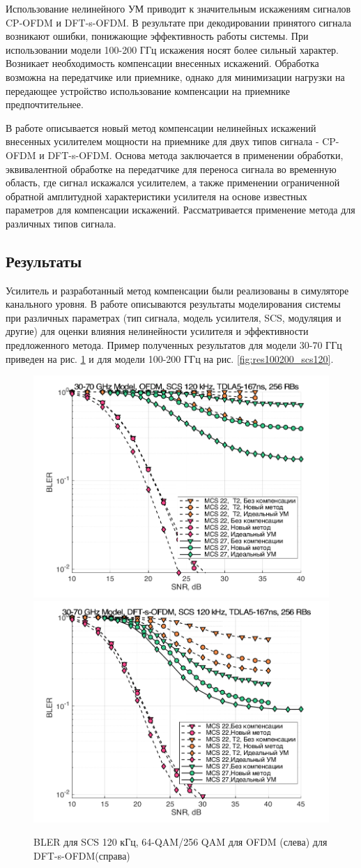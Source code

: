 Использование нелинейного УМ приводит к значительным искажениям сигналов
CP-OFDM и DFT-s-OFDM. В результате при декодировании принятого сигнала
возникают ошибки, понижающие эффективность работы системы. При
использовании модели 100-200 ГГц искажения носят более сильный характер.
Возникает необходимость компенсации внесенных искажений. Обработка возможна
на передатчике или приемнике, однако для минимизации нагрузки на передающее
устройство использование компенсации на приемнике предпочтительнее.

В работе описывается новый метод компенсации нелинейных искажений внесенных
усилителем мощности на приемнике для двух типов сигнала - CP-OFDM и
DFT-s-OFDM. Основа метода заключается в применении обработки, эквивалентной
обработке на передатчике для переноса сигнала во временную область, где
сигнал искажался усилителем, а также применении ограниченной обратной
амплитудной характеристики усилителя на основе известных параметров для
компенсации искажений. Рассматривается применение метода для различных
типов сигнала.

\subsection*{Результаты}
Усилитель и разработанный метод компенсации были реализованы в симуляторе
канального уровня. В работе описываются результаты моделирования системы
при различных параметрах (тип сигнала, модель усилителя, SCS, модуляция и
другие) для оценки влияния нелинейности усилителя и эффективности
предложенного метода. Пример полученных результатов для модели 30-70 ГГц
приведен на рис. \ref{fig:res3070_scs120} и для модели 100-200 ГГц на рис.
\ref{fig:res100200_scs120}.
\begin{figure}[h!]
    \centering
    \includegraphics[width=0.49\linewidth]{figs/res/ofdm/OFDM_Nokia_SCS120_MCS22_27.png}
    \includegraphics[width=0.49\linewidth]{figs/res/dftsofdm/DFT-s-OFDM_Nokia_SCS120_MCS22_27.png}
    \caption{BLER для SCS 120 кГц, 64-QAM/256 QAM для OFDM (слева) для DFT-s-OFDM(справа)}
    \label{fig:res3070_scs120}
\end{figure}


